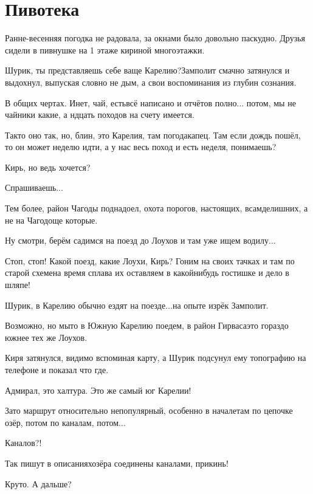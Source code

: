 \chapter{Пивотека}
\vepsianrose

Ранне-весенняя погодка не радовала, за окнами было довольно паскудно. Друзья сидели в пивнушке на 1 этаже кириной многоэтажки.

\diagdash Шурик, ты представляешь себе ваще Карелию?\mdash Замполит смачно затянулся и выдохнул, выпуская словно не дым, а свои воспоминания из глубин сознания.

\diagdash В общих чертах. Инет, чай, есть\mdash всё написано и отчётов полно$\ldots$ потом, мы не чайники какие, а н\sdash дцать походов на счету имеется.

\diagdash Так\sdash то оно так, но, блин, это Карелия, там погода\mdash капец. Там если дождь пошёл, то он может неделю идти, а у нас весь поход и есть неделя, понимаешь?

\diagdash Кирь, но ведь хочется?

\diagdash Спрашиваешь$\ldots$

\diagdash Тем более, район Чагоды поднадоел, охота порогов, настоящих, всамделишних, а не на Чагодоще которые.

\diagdash Ну смотри, берём садимся на поезд до Лоухов и там уже ищем водилу$\ldots$

\diagdash Стоп, стоп! Какой поезд, какие Лоухи, Кирь? Гоним на своих тачках и там по старой схеме\mdash на время сплава их оставляем в какой\sdash нибудь гостишке и дело в шляпе!

\diagdash Шурик, в Карелию обычно ездят на поезде$\ldots$\mdash на опыте изрёк Замполит.

\diagdash Возможно, но мы\sdash то в Южную Карелию поедем, в район Гирваса\mdash это гораздо южнее тех же Лоухов.

Киря затянулся, видимо вспоминая карту, а Шурик подсунул ему топографию на телефоне и показал что где.

\diagdash Адмирал, это халтура. Это же самый юг Карелии!

\diagdash Зато маршрут относительно непопулярный, особенно в начале\mdash там по цепочке озёр, потом по каналам, потом$\ldots$

\diagdash Каналов?!

\diagdash Так пишут в описаниях\mdash озёра соединены каналами, прикинь!

\diagdash Круто. А дальше? 


